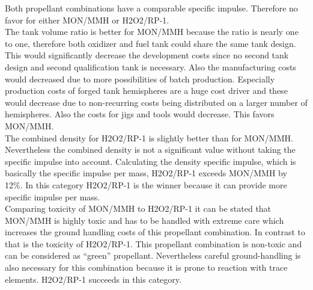 Both propellant combinations have a comparable specific impulse. Therefore no favor for either MON/MMH or H2O2/RP-1.\\

The tank volume ratio is better for MON/MMH because the ratio is nearly one to one, therefore both oxidizer and fuel tank could share the same tank design. This would significantly decrease the development costs since no second tank design and second qualification tank is necessary. Also the manufacturing costs would decreased due to more possibilities of batch production. Especially production costs of forged tank hemispheres are a huge cost driver and these would decrease due to non-recurring costs being distributed on a larger number of hemispheres.  Also the costs for jigs and tools would decrease. This favors MON/MMH.\\

The combined density for H2O2/RP-1 is slightly better than for MON/MMH. Nevertheless the combined density is not a significant value without taking the specific impulse into account. Calculating the density specific impulse, which is basically the specific impulse per mass, H2O2/RP-1 exceeds MON/MMH by 12\%. In this category H2O2/RP-1 is the winner because it can provide more specific impulse per mass.\\

Comparing toxicity of MON/MMH to H2O2/RP-1 it can be stated that MON/MMH is highly toxic and has to be handled with extreme care which increases the ground handling costs of this propellant combination. In contrast to that is the toxicity of H2O2/RP-1. This propellant combination is non-toxic and can be considered as “green” propellant. Nevertheless careful ground-handling is also necessary for this combination because it is prone to reaction with trace elements. H2O2/RP-1 succeeds in this category.\\

